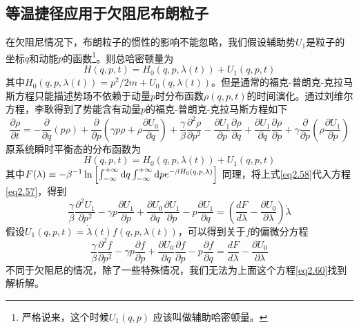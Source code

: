 \subsection{等温捷径应用于欠阻尼布朗粒子}
\qquad 在欠阻尼情况下，布朗粒子的惯性的影响不能忽略，我们假设辅助势$U_1$是粒子的坐标$q$和动能$p$的函数\footnote{严格说来，这个时候$U_1 (q,p)$ 应该叫做辅助哈密顿量。}。则总哈密顿量为
\begin{equation}
    H(q, p, t)=H_{0}(q, p, \lambda(t))+U_{1}(q, p, t)
    \label{eq2.56}
\end{equation}
其中$H_{0}(q, p, \lambda(t))=p^{2}/{2 m}+U_{0}(q, \lambda(t))$。但是通常的福克-普朗克-克拉马斯方程只能描述势场不依赖于动量$p$时分布函数$\rho (q,p,t)$的时间演化。通过刘维尔方程，李耿\cite{Li2016}得到了势能含有动量$p$的福克-普朗克-克拉马斯方程如下
\begin{equation}
        \frac{\partial \rho}{\partial t}=-\frac{\partial}{\partial q}(p \rho)+\frac{\partial}{\partial p}\left(\gamma p \rho+\rho \frac{\partial U_{0}}{\partial q}\right)+\frac{\gamma}{\beta} \frac{\partial^{2} \rho}{\partial p^{2}} -\frac{\partial U_{1}}{\partial p} \frac{\partial \rho}{\partial q}+\frac{\partial U_{1}}{\partial q} \frac{\partial \rho}{\partial p}+\gamma \frac{\partial}{\partial p}\left(\rho \frac{\partial U_{1}}{\partial p}\right)
    \label{eq2.57}
\end{equation}
原系统瞬时平衡态的分布函数为
\begin{equation}
    H(q, p, t)=H_{0}(q, p, \lambda(t))+U_{1}(q, p, t)
    \label{eq2.58}
\end{equation}
其中$F(\lambda) \equiv-\beta^{-1} \ln \left[\int_{-\infty}^{+\infty} \mathrm{d} q \int_{-\infty}^{+\infty} \mathrm{d} p e^{-\beta H_{0}(q, p, \lambda)}\right]$
同理，将上式\eqref{eq2.58}代入方程\eqref{eq2.57}，得到
\begin{equation}
    \frac{\gamma}{\beta} \frac{\partial^{2} U_{1}}{\partial p^{2}}-\gamma p \frac{\partial U_{1}}{\partial p}+\frac{\partial U_{0}}{\partial q} \frac{\partial U_{1}}{\partial p}-p \frac{\partial U_{1}}{\partial q}=\left(\frac{d F}{d \lambda}-\frac{\partial U_{0}}{\partial \lambda}\right) \dot{\lambda}
    \label{eq2.59}
\end{equation}
假设$U_{1}(q, p, t)=\dot{\lambda}(t) f(q, p, \lambda(t))$，可以得到关于$f$的偏微分方程
\begin{equation}
    \frac{\gamma}{\beta} \frac{\partial^{2} f}{\partial p^{2}}-\gamma p \frac{\partial f}{\partial p}+\frac{\partial U_{0}}{\partial q} \frac{\partial f}{\partial p}-p \frac{\partial f}{\partial q}=\frac{d F}{d \lambda}-\frac{\partial U_{0}}{\partial \lambda}
    \label{eq2.60}
\end{equation}
不同于欠阻尼的情况，除了一些特殊情况，我们无法为上面这个方程\eqref{eq2.60}找到解析解。

